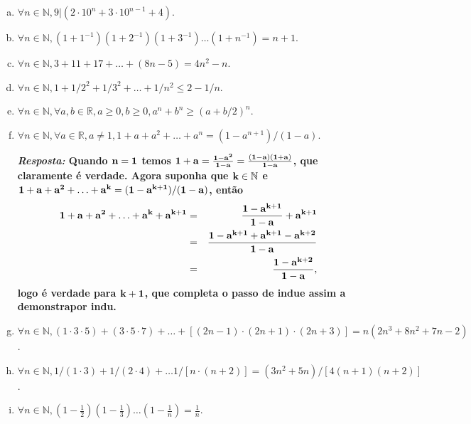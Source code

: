 \begin{enumerate}[{\bf 1.}]
\begin{enumerate}[a)]
{\bf{\it Resposta:} Quando ${\bf n=1}$ temos ${\bf 1^1\geq 1!}$ que \'e verdade. Agora suponha ${\bf k\in\mathbb{N}}$ e ${\bf k^k\geq k!}$. Assim, ${\bf  (k+1)^{k+1}=(k+1)^{k}(k+1)\geq k^k(k+1)\geq k!(k+1)=(k+1)!},$ logo \'e verdade para ${\bf k+1}$, que completa o passo de indu\cao e assim a demonstra\cao por indu\caoi.}

\item $\forall n\in\mathbb{N}, 9|(2\cdot 10^n+3\cdot 10^{n-1}+4)$.
\item $\forall n\in\mathbb{N}, (1+1^{-1})(1+2^{-1})(1+3^{-1})\ldots(1+n^{-1})=n+1$.
\item $\forall n\in\mathbb{N}, 3+11+17+\ldots+(8n-5)=4n^2-n$.
\item $\forall n\in\mathbb{N}, 1+1/2^2+1/3^2+\ldots+1/n^2\leq 2-1/n$.
\item $\forall n\in\mathbb{N}, \forall a,b\in\mathbb{R}, a\geq 0, b\geq 0, a^n+b^n\geq(a+b/2)^n$.
\item $\forall n\in\mathbb{N}, \forall a\in\mathbb{R}, a\neq 1, 1+a+a^2+\ldots+a^n=(1-a^{n+1})/(1-a)$.

{\bf{\it Resposta:} Quando ${\bf n=1}$ temos ${\bf 1+a=\frac{1-a^2}{1-a}=\frac{(1-a)(1+a)}{1-a}}$, que claramente é verdade. Agora suponha que ${\bf k\in\mathbb{N}}$ e ${\bf 1+a+a^2+\ldots+a^k=(1-a^{k+1})/(1-a)}$, então
\begin{eqnarray*}
{\bf 1+a+a^2+\ldots+a^k+a^{k+1}}&=&{\bf  \frac{1-a^{k+1}}{1-a}+a^{k+1}}\\
                          &=&{\bf  \frac{1-a^{k+1}+a^{k+1}-a^{k+2}}{1-a}}\\
                          &=&{\bf  \frac{1-a^{k+2}}{1-a}},
\end{eqnarray*}  
logo \'e verdade para ${\bf k+1}$, que completa o passo de indu\cao e assim a demonstra\cao por indu\caoi.}

\item $\forall n\in\mathbb{N}, (1\cdot 3\cdot 5)+(3\cdot 5\cdot 7)+\ldots+[(2n-1)\cdot (2n+1)\cdot (2n+3)]=n(2n^3+8n^2+7n-2)$.
\item $\forall n\in\mathbb{N}, 1/(1\cdot 3)+1/(2\cdot 4)+\ldots1/[n\cdot(n+2)]=(3n^2+5n)/[4(n+1)(n+2)]$.
\item $\forall n\in\mathbb{N}, (1-\frac{1}{2})(1-\frac{1}{3})\ldots(1-\frac{1}{n})=\frac{1}{n}$.


\end{enumerate}
\end{enumerate}
